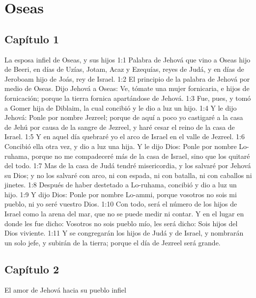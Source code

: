 \chapter{Oseas}
\section*{Capítulo 1 }
La esposa infiel de Oseas, y sus hijos 
1:1 Palabra de Jehová que vino a Oseas hijo de Beeri, en días de Uzías,  Jotam, Acaz y Ezequías, reyes de Judá, y en días de Jeroboam hijo de Joás, rey de Israel. 
1:2 El principio de la palabra de Jehová por medio de Oseas. Dijo Jehová a Oseas: Ve, tómate una mujer fornicaria, e hijos de fornicación; porque la tierra fornica apartándose de Jehová. 
1:3 Fue, pues, y tomó a Gomer hija de Diblaim, la cual concibió y le dio a luz un hijo. 
1:4 Y le dijo Jehová: Ponle por nombre Jezreel; porque de aquí a poco yo castigaré a la casa de Jehú por causa de la sangre de Jezreel, y haré cesar el reino de la casa de Israel. 
1:5 Y en aquel día quebraré yo el arco de Israel en el valle de Jezreel. 
1:6 Concibió ella otra vez, y dio a luz una hija. Y le dijo Dios: Ponle por nombre Lo-ruhama, porque no me compadeceré más de la casa de Israel, sino que los quitaré del todo. 
1:7 Mas de la casa de Judá tendré misericordia, y los salvaré por Jehová su Dios; y no los salvaré con arco, ni con espada, ni con batalla, ni con caballos ni jinetes. 
1:8 Después de haber destetado a Lo-ruhama, concibió y dio a luz un hijo. 
1:9 Y dijo Dios: Ponle por nombre Lo-ammi, porque vosotros no sois mi pueblo, ni yo seré vuestro Dios. 
1:10 Con todo, será el número de los hijos de Israel como la arena del mar, que no se puede medir ni contar. Y en el lugar en donde les fue dicho: Vosotros no sois pueblo mío, les será dicho: Sois hijos del Dios viviente. 
1:11 Y se congregarán los hijos de Judá y de Israel, y nombrarán un solo jefe, y subirán de la tierra; porque el día de Jezreel será grande. 
\section*{Capítulo 2 }
	El amor de Jehová hacia su pueblo infiel 
	
